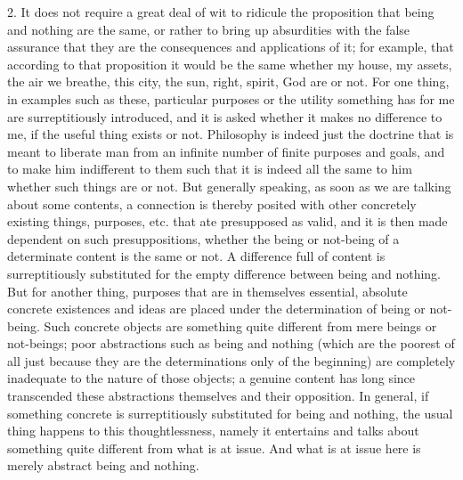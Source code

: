 2. It does not require a great deal of wit to ridicule
the proposition that being and nothing are the same,
or rather to bring up absurdities with the false assurance
that they are the consequences and applications of it;
for example, that according to that proposition
it would be the same whether my house, my assets,
the air we breathe, this city, the sun,
right, spirit, God are or not.
For one thing, in examples such as these, particular purposes
or the utility something has for me are surreptitiously introduced,
and it is asked whether it makes no difference to me,
if the useful thing exists or not.
Philosophy is indeed just the doctrine that is meant
to liberate man from an infinite number of finite purposes and goals,
and to make him indifferent to them such that it is indeed
all the same to him whether such things are or not.
But generally speaking, as soon as we are talking about some contents,
a connection is thereby posited with other concretely existing things,
purposes, etc. that ate presupposed as valid, and
it is then made dependent on such presuppositions,
whether the being or not-being of a determinate content is
the same or not.
A difference full of content is surreptitiously substituted for the
empty difference between being and nothing.
But for another thing, purposes that are in themselves
essential, absolute concrete existences and ideas are
placed under the determination of being or not-being.
Such concrete objects are something quite different
from mere beings or not-beings;
poor abstractions such as being and nothing
(which are the poorest of all just because
they are the determinations only of the beginning)
are completely inadequate to the nature of those objects;
a genuine content has long since transcended
these abstractions themselves and their opposition.
In general, if something concrete is surreptitiously substituted
for being and nothing, the usual thing happens to this thoughtlessness,
namely it entertains and talks about something
quite different from what is at issue.
And what is at issue here is merely abstract being and nothing.

